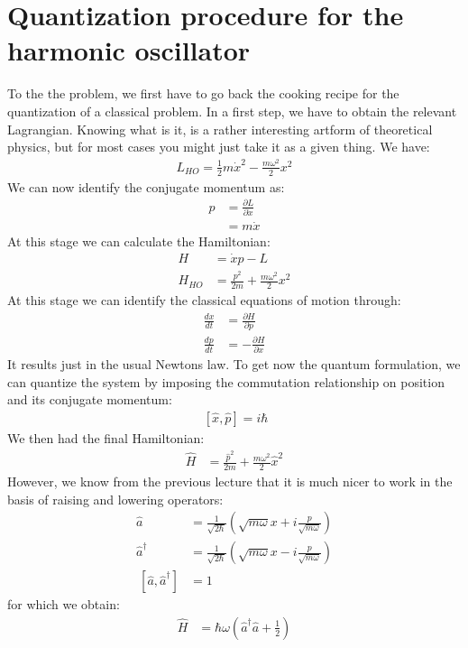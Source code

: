 \documentclass[10pt]{article}
\begin{document}
\section{Quantization procedure for the harmonic oscillator}\label{Eq:QuantHO}
To the the problem, we first have to go back the cooking recipe for the quantization of a classical problem.  In a first step, we have to obtain the relevant Lagrangian. Knowing what is it, is a rather interesting artform of theoretical physics, but for most cases you might just take it as a given thing. We have:
\begin{align}
L_{HO} = \frac{1}{2}m\dot{x}^2-\frac{m\omega^2}{2}x^2
\end{align}
We can now identify the conjugate momentum as:
\begin{align}
p &= \frac{\partial L}{\partial \dot{x}}\\
 &= m\dot{x}
\end{align}
At this stage we can calculate the Hamiltonian:
\begin{align}
H &= \dot{x}p - L\\
H_{HO} &= \frac{p^2}{2m}+\frac{m\omega^2}{2}x^2
\end{align}
At this stage we can identify the classical equations of motion through:
\begin{align}
\frac{dx}{dt}&= \frac{\partial H}{\partial p}\\
\frac{dp}{dt}&= -\frac{\partial H}{\partial x}
\end{align}
It results just in the usual Newtons law. To get now the quantum formulation, we can quantize the system by imposing the commutation relationship on position and its conjugate momentum:
\begin{align}
~[\hat{x}, \hat{p}] = i\hbar
\end{align}
We then had the final Hamiltonian:
\begin{align}
\hat{H} &= \frac{\hat{p}^2}{2m}+\frac{m\omega^2}{2}\hat{x}^2
\end{align}
However, we know from the previous lecture that it is much nicer to work in the basis of raising and lowering operators:
\begin{align}
\hat{a} &= \frac{1}{\sqrt{2\hbar}}\left(\sqrt{m\omega}x+i\frac{p}{\sqrt{m\omega}}\right)\\
\hat{a}^\dag &= \frac{1}{\sqrt{2\hbar}}\left(\sqrt{m\omega}x-i\frac{p}{\sqrt{m\omega}}\right)\\
~[\hat{a}, \hat{a}^\dag] &=1
\end{align}
for which we obtain:
\begin{align}
\hat{H} &=\hbar\omega\left(\hat{a}^\dag \hat{a}+\frac{1}{2}\right)
\end{align}
\end{document}
